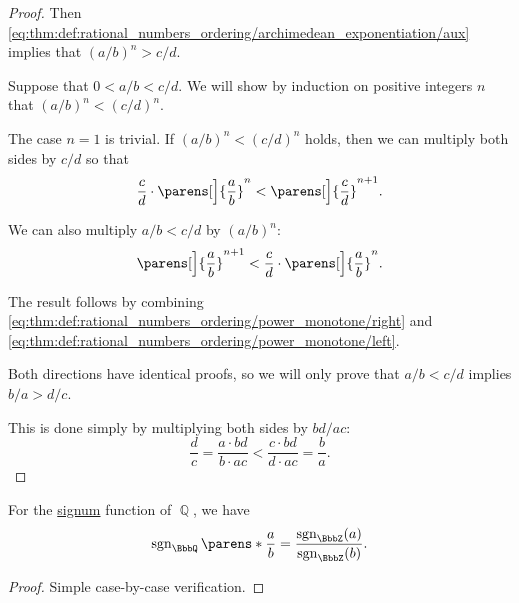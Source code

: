 \begin{proof}
  Then \eqref{eq:thm:def:rational_numbers_ordering/archimedean_exponentiation/aux} implies that \( (a / b)^n > c / d \).

   Suppose that \( 0 < a / b < c / d \). We will show by induction on positive integers \( n \) that \( (a / b)^n < (c / d)^n \).

  The case \( n = 1 \) is trivial. If \( (a / b)^n < (c / d)^n \) holds, then we can multiply both sides by \( c / d \) so that
  \begin{equation}\label{eq:thm:def:rational_numbers_ordering/power_monotone/right}
    \frac c d \cdot \parens[\Big]{ \frac a b }^n < \parens[\Big]{ \frac c d }^{n+1}.
  \end{equation}

  We can also multiply \( a / b < c / d \) by \( (a / b)^n \):
  \begin{equation}\label{eq:thm:def:rational_numbers_ordering/power_monotone/left}
    \parens[\Big]{ \frac a b }^{n + 1} < \frac c d \cdot \parens[\Big]{ \frac a b }^n.
  \end{equation}

  The result follows by combining \eqref{eq:thm:def:rational_numbers_ordering/power_monotone/right} and \eqref{eq:thm:def:rational_numbers_ordering/power_monotone/left}.

   Both directions have identical proofs, so we will only prove that \( a / b < c / d \) implies \( b / a > d / c \).

  This is done simply by multiplying both sides by \( {bd} / {ac} \):
  \begin{equation*}
    \frac d c = \frac {a \cdot bd} {b \cdot ac} < \frac {c \cdot bd} {d \cdot ac} = \frac b a.
  \end{equation*}
\end{proof}

\begin{proposition}\label{thm:rational_number_signum}\mimprovised
  For the \hyperref[def:signum]{signum} function of \( \BbbQ \), we have
  \begin{equation*}
    \sgn_\BbbQ\parens*{ \frac a b } = \frac {\sgn_\BbbZ(a)} {\sgn_\BbbZ(b)}.
  \end{equation*}
\end{proposition}
\begin{proof}
  Simple case-by-case verification.
\end{proof}

